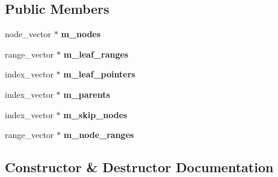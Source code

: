 \subsection*{Public Members}
\begin{DoxyCompactItemize}
\item 
\mbox{\label{structcugar_1_1_bintree__writer_ad23ee37955a658ab99d345082fe3cdaa}} 
node\+\_\+vector $\ast$ {\bfseries m\+\_\+nodes}
\item 
\mbox{\label{structcugar_1_1_bintree__writer_a95aad906c69c6b972e202a6f793c7ba6}} 
range\+\_\+vector $\ast$ {\bfseries m\+\_\+leaf\+\_\+ranges}
\item 
\mbox{\label{structcugar_1_1_bintree__writer_aa9ae4f117b46181f5e343874eb54ef8b}} 
index\+\_\+vector $\ast$ {\bfseries m\+\_\+leaf\+\_\+pointers}
\item 
\mbox{\label{structcugar_1_1_bintree__writer_a6970c2fd61bb561034d8066fd6b0e5e9}} 
index\+\_\+vector $\ast$ {\bfseries m\+\_\+parents}
\item 
\mbox{\label{structcugar_1_1_bintree__writer_a785cf47888d5ae0a434600d909b95728}} 
index\+\_\+vector $\ast$ {\bfseries m\+\_\+skip\+\_\+nodes}
\item 
\mbox{\label{structcugar_1_1_bintree__writer_a3ddae8b3ffa9049895c812b1d3e468d4}} 
range\+\_\+vector $\ast$ {\bfseries m\+\_\+node\+\_\+ranges}
\end{DoxyCompactItemize}


\subsection{Constructor \& Destructor Documentation}
\mbox{\label{structcugar_1_1_bintree__writer_aa6285a28d4809fe64221e532ecbec891}} 
